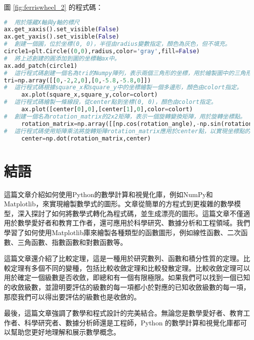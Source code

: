 \documentclass[12pt, a4paper]{article}
\begin{document}
圖 \ref{fig:ferriswheel_2} 的程式碼：
\begin{lstlisting}[language=Python]
#  用於隱藏X軸與y軸的標尺
ax.get_xaxis().set_visible(False)
ax.get_yaxis().set_visible(False)
#  創建一個圓，位於坐標(0, 0)，半徑由radius變數指定，顏色為灰色，但不填充。
circle1=plt.Circle((0,0),radius,color='gray',fill=False)
#  將上述創建的圓添加到圖的坐標軸ax中。
ax.add_patch(circle1)
#  這行程式碼創建一個名為tri的Numpy陣列，表示兩個三角形的坐標，用於繪製圖中的三角形。
tri=np.array([[0,-2,2,0],[0,-5.8,-5.8,0]])
#  這行程式碼根據square_x和square_y中的坐標繪製一個多邊形，顏色由colort指定。
     ax.plot(square_x,square_y,color=colort)
#  這行程式碼繪製一條線段，從center點到坐標(0, 0)，顏色由colort指定。
     ax.plot([center[0],0],[center[1],0],color=colort)
#  創建一個名為rotation_matrix的2x2矩陣，表示一個旋轉變換矩陣，用於旋轉坐標點。
     rotation_matrix=np.array([[np.cos(rotation_angle),-np.sin(rotation_angle)],[np.sin(rotation_angle),np.cos(rotation_angle)]])
#  這行程式碼使用矩陣乘法將旋轉矩陣rotation_matrix應用於center點，以實現坐標點的旋轉。center點現在將成為旋轉後的新坐標。
     center=np.dot(rotation_matrix,center)
\end{lstlisting}
\section{結語}
這篇文章介紹如何使用Python的數學計算和視覺化庫，例如NumPy和Matplotlib，來實現繪製數學式的圖形。文章從簡單的方程式到更複雜的數學模型，深入探討了如何將數學式轉化為程式碼，並生成漂亮的圖形。這篇文章不僅適用於數學愛好者和教育工作者，還可應用於科學研究、數據分析和工程領域。我們學習了如何使用Matplotlib庫來繪製各種類型的函數圖形，例如線性函數、二次函數、三角函數、指數函數和對數函數等。

這篇文章還介紹了比較定理，這是一種用於研究數列、函數和積分性質的定理。比較定理有多個不同的變種，包括比較收斂定理和比較發散定理。比較收斂定理可以用於確定一個級數是否收斂，即總和有一個有限極限。如果我們可以找到一個已知的收斂級數，並證明要評估的級數的每一項都小於對應的已知收斂級數的每一項，那麼我們可以得出要評估的級數也是收斂的。

最後，這篇文章強調了數學和程式設計的完美結合。無論您是數學愛好者、教育工作者、科學研究者、數據分析師還是工程師，Python 的數學計算和視覺化庫都可以幫助您更好地理解和展示數學概念。
\end{document}
